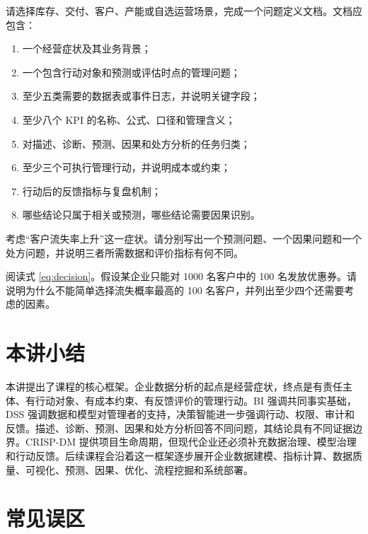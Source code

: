 \documentclass[UTF8,fontset=fandol,openany,zihao=-4]{ctexbook}
\begin{document}
\begin{exercise}
请选择库存、交付、客户、产能或自选运营场景，完成一个问题定义文档。文档应包含：
\begin{enumerate}
  \item 一个经营症状及其业务背景；
  \item 一个包含行动对象和预测或评估时点的管理问题；
  \item 至少五类需要的数据表或事件日志，并说明关键字段；
  \item 至少八个 KPI 的名称、公式、口径和管理含义；
  \item 对描述、诊断、预测、因果和处方分析的任务归类；
  \item 至少三个可执行管理行动，并说明成本或约束；
  \item 行动后的反馈指标与复盘机制；
  \item 哪些结论只属于相关或预测，哪些结论需要因果识别。
\end{enumerate}
\end{exercise}

\begin{exercise}
考虑“客户流失率上升”这一症状。请分别写出一个预测问题、一个因果问题和一个处方问题，并说明三者所需数据和评价指标有何不同。
\end{exercise}

\begin{exercise}
阅读式 \eqref{eq:decision}。假设某企业只能对 1000 名客户中的 100 名发放优惠券。请说明为什么不能简单选择流失概率最高的 100 名客户，并列出至少四个还需要考虑的因素。
\end{exercise}

\section*{本讲小结}

本讲提出了课程的核心框架。企业数据分析的起点是经营症状，终点是有责任主体、有行动对象、有成本约束、有反馈评价的管理行动。BI 强调共同事实基础，DSS 强调数据和模型对管理者的支持，决策智能进一步强调行动、权限、审计和反馈。描述、诊断、预测、因果和处方分析回答不同问题，其结论具有不同证据边界。CRISP-DM 提供项目生命周期，但现代企业还必须补充数据治理、模型治理和行动反馈。后续课程会沿着这一框架逐步展开企业数据建模、指标计算、数据质量、可视化、预测、因果、优化、流程挖掘和系统部署。

\section*{常见误区}
\end{document}
